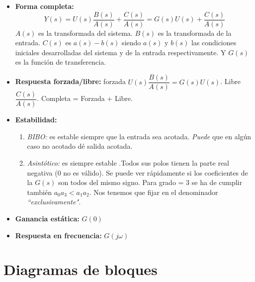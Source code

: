 \documentclass[a4paper, twocolumn, 10pt]{article}
\begin{document}
\begin{itemize}
	\item \textbf{Forma completa:} \[Y(s) = U(s)\frac{B(s)}{A(s)} + \frac{C(s)}{A(s)} = G(s)U(s) + \frac{C(s)}{A(s)}\] $A(s)$ es la transformada del sistema. $B(s)$ es la transformada de la entrada. $C(s)$ es $a(s) - b(s)$ siendo $a(s)$ y $b(s)$ las condiciones iniciales desarrolladas del sistema y de la entrada respectivamente. Y $G(s)$ es la función de transferencia.
	\item \textbf{Respuesta forzada/libre:} forzada $U(s)\dfrac{B(s)}{A(s)} = G(s)U(s)$. Libre $\dfrac{C(s)}{A(s)}$. Completa = Forzada + Libre.
	\item \textbf{Estabilidad:}
	\begin{enumerate}
		\item \textit{BIBO:} es estable siempre que la entrada sea acotada. \textit{Puede} que en algún caso no acotado dé salida acotada.
		\item \textit{Asintótico:} es siempre estable .Todos sus polos tienen la parte real negativa (0 no es válido). Se puede ver rápidamente si los coeficientes de la $G(s)$ son todos del mismo signo. Para grado = 3 se ha de cumplir también $a_0a_3<a_1a_2$. Nos tenemos que fijar en el denominador \textit{``exclusivamente".}
	\end{enumerate}
	\item \textbf{Ganancia estática:} $G(0)$
	\item \textbf{Respuesta en frecuencia:} $G(j\omega)$
\end{itemize}

\section{Diagramas de bloques}
\end{document}
